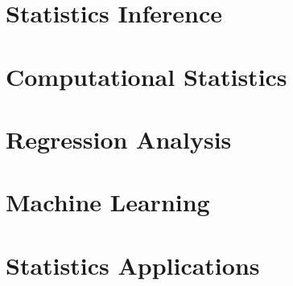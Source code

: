 \documentclass[12pt]{prettybook}
\begin{document}
\part{Statistics Inference}






\part{Computational Statistics}



\part{Regression Analysis}






\part{Machine Learning}





\part{Statistics Applications}




\appendix

\backmatter
\printbibliography
\end{document}
